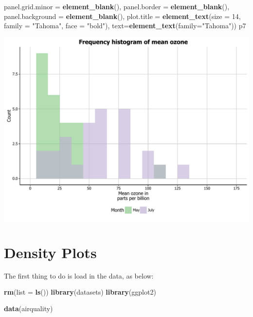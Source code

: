 \documentclass[]{article}
\newenvironment{Shaded}{\begin{snugshade}}{\end{snugshade}}
\newcommand{\KeywordTok}[1]{\textcolor[rgb]{0.13,0.29,0.53}{\textbf{{#1}}}}
\newcommand{\DataTypeTok}[1]{\textcolor[rgb]{0.13,0.29,0.53}{{#1}}}
\newcommand{\DecValTok}[1]{\textcolor[rgb]{0.00,0.00,0.81}{{#1}}}
\newcommand{\StringTok}[1]{\textcolor[rgb]{0.31,0.60,0.02}{{#1}}}
\newcommand{\NormalTok}[1]{{#1}}
\begin{document}
\begin{Shaded}
\begin{Highlighting}[]
            \DataTypeTok{panel.grid.minor =} \KeywordTok{element_blank}\NormalTok{(), }
            \DataTypeTok{panel.border =} \KeywordTok{element_blank}\NormalTok{(), }\DataTypeTok{panel.background =} \KeywordTok{element_blank}\NormalTok{(),}
            \DataTypeTok{plot.title =} \KeywordTok{element_text}\NormalTok{(}\DataTypeTok{size =} \DecValTok{14}\NormalTok{, }\DataTypeTok{family =} \StringTok{"Tahoma"}\NormalTok{, }\DataTypeTok{face =} \StringTok{"bold"}\NormalTok{),}
            \DataTypeTok{text=}\KeywordTok{element_text}\NormalTok{(}\DataTypeTok{family=}\StringTok{"Tahoma"}\NormalTok{))}
\NormalTok{p7}
\end{Highlighting}
\end{Shaded}

\begin{center}\includegraphics{0_all_posts_pdf/histogram_20-1} \end{center}

\section{Density Plots}\label{density-plots}

The first thing to do is load in the data, as below:

\begin{Shaded}
\begin{Highlighting}[]
\KeywordTok{rm}\NormalTok{(}\DataTypeTok{list =} \KeywordTok{ls}\NormalTok{())}
\KeywordTok{library}\NormalTok{(datasets)}
\KeywordTok{library}\NormalTok{(ggplot2)}

\KeywordTok{data}\NormalTok{(airquality)}
\end{Highlighting}
\end{Shaded}
\end{document}
